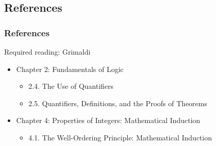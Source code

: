 \documentclass[dvipsnames]{beamer}
\begin{document}
%
%

\subsection*{References}

\begin{frame}
  \frametitle{References}

  \begin{block}{Required reading: Grimaldi}
    \begin{itemize}
      \item Chapter 2: Fundamentals of Logic
      \begin{itemize}
        \item 2.4. \alert{The Use of Quantifiers}
        \item 2.5. \alert{Quantifiers, Definitions, and the Proofs of Theorems}
      \end{itemize}
      \item Chapter 4: Properties of Integers: Mathematical Induction
      \begin{itemize}
        \item 4.1. \alert{The Well-Ordering Principle: Mathematical Induction}
      \end{itemize}
    \end{itemize}
  \end{block}
\end{frame}
\end{document}
